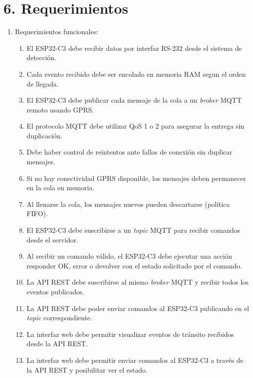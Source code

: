 \documentclass[
11pt, %
]{charter}
\begin{document}
\section{6. Requerimientos}
\label{sec:requerimientos}


\begin{enumerate}
	\item Requerimientos funcionales:
			\begin{enumerate}
			\item El ESP32-C3 debe recibir datos por interfaz RS-232 desde el sistema de detección.
			\item  Cada evento recibido debe ser encolado en memoria RAM segun el orden de llegada.
			\item  El ESP32-C3 debe publicar cada mensaje de la cola a un \textit{broker} MQTT remoto usando GPRS.
			\item  El protocolo MQTT debe utilizar QoS 1 o 2 para asegurar la entrega sin duplicación.
			\item  Debe haber control de reintentos ante fallos de conexión sin duplicar mensajes.
			\item  Si no hay conectividad GPRS disponible, los mensajes deben permanecer en la cola en memoria.
			\item  Al llenarse la cola, los mensajes nuevos pueden descartarse (política FIFO).
			\item  El ESP32-C3 debe  suscribirse a un \textit{topic} MQTT para recibir comandos desde el servidor.
			\item  Al recibir un comando válido, el ESP32-C3 debe ejecutar una acción responder OK, error o   devolver con el estado solicitado por el comando.
			\item  La API REST debe suscribirse al mismo \textit{broker} MQTT y recibir todos los eventos publicados.
			\item  La API REST debe poder enviar comandos al ESP32-C3 publicando en el \textit{topic} correspondiente.
			\item  La interfaz web debe permitir visualizar eventos de tránsito recibidos desde la API REST.
			\item  La interfaz web debe permitir enviar comandos al ESP32-C3 a través de la API REST y posibilitar ver el estado.
		\end{enumerate}
		

\end{enumerate}
\end{document}
